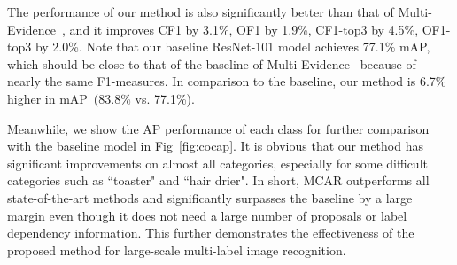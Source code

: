 \documentclass[journal]{IEEEtran}
\begin{document}
The performance of our method is also significantly better than that of Multi-Evidence~\cite{ge2018multi}, and it improves CF1 by 3.1\%, OF1 by 1.9\%, CF1-top3 by 4.5\%, OF1-top3 by 2.0\%.  
Note that our baseline ResNet-101 model achieves 77.1\% mAP, which should be close to that of the baseline of Multi-Evidence~\cite{ge2018multi} because of nearly the same F1-measures. 
In comparison to the baseline, our method is 6.7\% higher in mAP~(83.8\% vs. 77.1\%).

Meanwhile, we show the AP performance of each class for further comparison with the baseline model in Fig~\ref{fig:cocap}. It is obvious that our method has significant improvements on almost all categories, especially for some difficult categories such as ``toaster" and ``hair drier". In short, MCAR outperforms all state-of-the-art methods and significantly surpasses the baseline by a large margin even though it does not need a large number of proposals or label dependency information. This further demonstrates the effectiveness of the proposed method for large-scale multi-label image recognition. 
\end{document}
